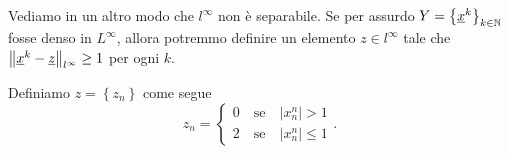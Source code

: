Vediamo in un altro modo che $l^\infty$ non è separabile. 
Se per assurdo $Y = \left\{ \underline{x}^k \right\}_{k \in \mathbb N}$ fosse denso in $L^\infty$, allora potremmo definire un elemento $z \in l^\infty$ tale che $\left\lVert \underline{x}^k - \underline{z} \right\rVert_{l^\infty} \geq 1$ per ogni $k$.

Definiamo $z = \left\{ z_n \right\}$ come segue
%
$$
z_n = 
\begin{cases}
0 \quad \text{se} \quad | x_n^n | > 1 \\
2 \quad \text{se} \quad | x_n^n | \leq 1
\end{cases}. 
$$



